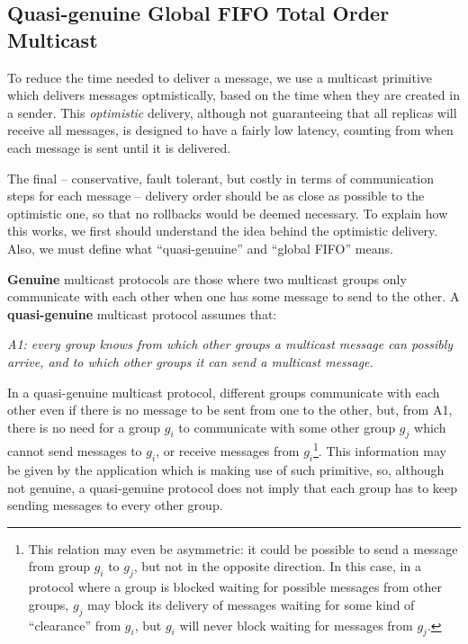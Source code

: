 \documentclass[times, 10pt]{article}
\begin{document}
\subsection{Quasi-genuine Global FIFO Total Order Multicast}
\label{sec:quasi}

To reduce the time needed to deliver a message, we use a multicast primitive which delivers messages optmistically, based on the time when they are created in a sender. This \emph{optimistic} delivery, although not guaranteeing that all replicas will receive all messages, is designed to have a fairly low latency, counting from when each message is sent until it is delivered.

The final -- conservative, fault tolerant, but costly in terms of communication steps for each message -- delivery order should be as close as possible to the optimistic one, so that no rollbacks would be deemed necessary. To explain how this works, we first should understand the idea behind the optimistic delivery. Also, we must define what ``quasi-genuine'' and ``global FIFO'' means.

\textbf{Genuine} multicast protocols are those where two multicast groups only communicate with each other when one has some message to send to the other. A \textbf{quasi-genuine} multicast protocol assumes that: 

\begin{center}
\emph{A1: every group knows from which other groups a multicast message can possibly arrive, and to which other groups it can send a multicast message.}
\end{center}

In a quasi-genuine multicast protocol, different groups communicate with each other even if there is no message to be sent from one to the other, but, from A1, there is no need for a group $g_i$ to communicate with some other group $g_j$ which cannot send messages to $g_i$, or receive messages from $g_i$\footnote{This relation may even be asymmetric: it could be possible to send a message from group $g_i$ to $g_j$, but not in the opposite direction. In this case, in a protocol where a group is blocked waiting for possible messages from other groups, $g_j$ may block its delivery of messages waiting for some kind of ``clearance'' from $g_i$, but $g_i$ will never block waiting for messages from $g_j$.}. This information may be given by the application which is making use of such primitive, so, although not genuine, a quasi-genuine protocol does not imply that each group has to keep sending messages to every other group.
\end{document}
